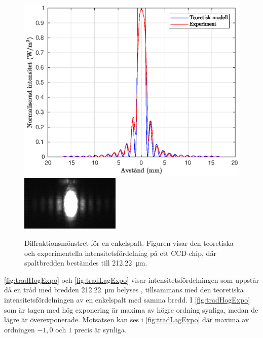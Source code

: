 \documentclass[a4paper]{article}
\begin{document}
\begin{figure}[h!]
	\centering
	\includegraphics[width=0.75\linewidth]{Data/Figurer/enkelspalt.eps}
	\includegraphics[width=0.5\linewidth]{Data/Figurer/enkelspalt.png}
	\caption{Diffraktionsmönstret för en enkelspalt. Figuren visar den teoretiska och experimentella intensitetsfördelning på ett CCD-chip, där spaltbredden bestämdes till \SI{212.22}{\micro\m}.}
	\label{fig:enkelspalt}
\end{figure}

\FloatBarrier

\autoref{fig:tradHogExpo} och \autoref{fig:tradLagExpo} visar intensitetsfördelningen som uppstår då en tråd med bredden \SI{212.22}{\micro\m} belyses , tillsammans med den teoretiska intensitetsfördelningen av en enkelspalt med samma bredd. I \autoref{fig:tradHogExpo} som är tagen med hög exponering är maxima av högre ordning synliga, medan de lägre är överexponerade. Motsatsen kan ses i \autoref{fig:tradLagExpo} där maxima av ordningen $-1, 0$ och $1$ precis är synliga.

\FloatBarrier
\end{document}
